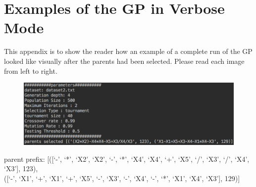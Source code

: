 \documentclass[11pt]{article}
\begin{document}
\newpage
\section{Examples of the GP in Verbose Mode}
This appendix is to show the reader how an example of a complete run of the GP looked like visually after the parents had been selected.  Please read each image from left to right. \\


\begin{figure}[h]
\centering
\includegraphics[scale = .60]{1}
\end{figure}
parent prefix:  [([`-', `*', `X2', `X2', `-', `*', `X4', `X4', `+', `X5', `/', `X3', `/', `X4', `X3'], 123), \\
([`-', `X1', `+', `X1', `+', `X5', `-', `X3', `-', `X4', `-', `*', `X1', `X4', `X3'], 129)]
\end{document}
